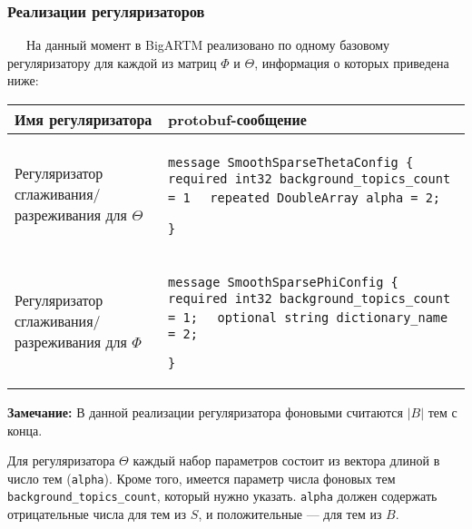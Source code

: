 \subsubsection{Реализации регуляризаторов} 
$\quad\;\:$На данный момент в BigARTM реализовано по одному базовому регуляризатору для каждой из матриц $\Phi$ и $\Theta$, информация о которых приведена ниже:

\begin{tabular}[t]{|p{14em}|p{26em}|}
\hline
\vspace{2pt} \textbf{Имя регуляризатора} \vspace{4pt} &
\vspace{2pt} \textbf{protobuf-сообщение} \vspace{4pt} \\

\hline
\vspace{4pt}

Регуляризатор сглаживания/ разреживания для $\Theta$ & 
\vspace{4pt}

\verb|message SmoothSparseThetaConfig {|
\verb|  required int32 background_topics_count = 1|
\verb|  repeated DoubleArray alpha = 2;|

\verb|}|
\vspace{4pt}

\\
\hline
\vspace{4pt}

Регуляризатор сглаживания/ разреживания для $\Phi$ &
\vspace{4pt}

\verb|message SmoothSparsePhiConfig {|
\verb|  required int32 background_topics_count = 1;|
\verb|  optional string dictionary_name = 2;|

\verb|}|
\vspace{4pt}

\\
\hline
\end{tabular}

\vspace{10pt}

{\bf Замечание:} В данной реализации регуляризатора фоновыми считаются $|B|$ тем с конца.

Для регуляризатора $\Theta$ каждый набор параметров состоит из вектора длиной в число тем (\verb|alpha|). Кроме того, имеется параметр числа фоновых тем \verb|background_topics_count|, который нужно указать. \verb|alpha| должен содержать отрицательные числа для тем из $S$, и положительные --- для тем из $B$.

